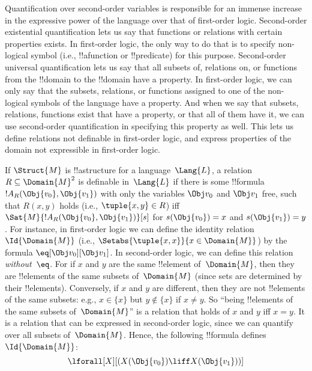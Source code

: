 \documentclass[../../../include/open-logic-section]{subfiles}
\begin{document}

\begin{explain}
Quantification over second-order variables is responsible for an
immense increase in the expressive power of the language over that of
first-order logic.  Second-order existential quantification lets us
say that functions or relations with certain properties exists. In
first-order logic, the only way to do that is to specify non-logical
symbol (i.e., !!a{function} or !!{predicate}) for this
purpose. Second-order universal quantification lets us say that all
subsets of, relations on, or functions from the !!{domain} to the
!!{domain} have a property.  In first-order logic, we can only say
that the subsets, relations, or functions assigned to one of the
non-logical symbols of the language have a property.  And when we say
that subsets, relations, functions exist that have a property, or that
all of them have it, we can use second-order quantification in
specifying this property as well. This lets us define relations not
definable in first-order logic, and express properties of the domain
not expressible in first-order logic.
\end{explain}

\begin{ex}
If $\Struct{M}$ is !!a{structure} for a language~$\Lang{L}$, a
relation~$R \subseteq \Domain{M}^2$ is definable in~$\Lang{L}$ if
there is some !!{formula}~$!A_R(\Obj{v_0}, \Obj{v_1})$ with only the
variables $\Obj v_0$ and $\Obj v_1$ free, such that $R(x, y)$ holds
(i.e., $\tuple{x,y} \in R$) iff $\Sat{M}{!A_R(\Obj{v_0},
  \Obj{v_1})}[s]$ for $s(\Obj{v_0}) = x$ and $s(\Obj{v_1}) = y$.  For
instance, in first-order logic we can define the identity
relation~$\Id{\Domain{M}}$ (i.e., $\Setabs{\tuple{x,x}}{x \in
  \Domain{M}}$) by the formula $\eq[\Obj v_0][\Obj v_1]$.  In
second-order logic, we can define this relation
\emph{without~$\eq$}. For if $x$ and $y$ are the same !!{element}
of~$\Domain{M}$, then they are !!{element}s of the same subsets
of~$\Domain{M}$ (since sets are determined by their
!!{element}s). Conversely, if $x$ and $y$ are different, then they are
not !!{element}s of the same subsets: e.g., $x \in \{x\}$ but $y
\notin \{x\}$ if $x \neq y$.  So ``being !!{element}s of the same
subsets of~$\Domain{M}$'' is a relation that holds of $x$ and $y$ iff
$x = y$. It is a relation that can be expressed in second-order logic,
since we can quantify over all subsets of~$\Domain{M}$. Hence, the
following !!{formula} defines $\Id{\Domain{M}}$:
\[
\lforall[X][(X(\Obj{v_0}) \liff X(\Obj{v_1}))]
\]
\end{ex}
\end{document}
